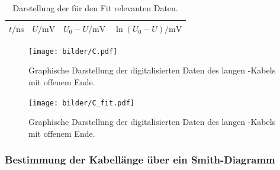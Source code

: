 \begin{table}[htpb]
  \centering
  \begin{tabular}{cccc}
    \midrule
    \midrule
    $t / \si{\nano\second}$ & $U / \si{\milli\volt}$ &
    $U_0 - U / \si{\milli\volt}$ & $\ln(U_0 - U) / \si{\milli\volt}$ \\
    \midrule
    
    \midrule
    \midrule
  \end{tabular}
  \caption{Darstellung der für den Fit relevanten Daten.}
\label{tab:C_fit}
\end{table}

\begin{figure}[htpb]
  \centering
  \texttt{[image: bilder/C.pdf]}
  \caption{Graphische Darstellung der digitalisierten Daten des langen
    \CU-Kabels mit offenem Ende.}
\label{fig:C_roh_Daten}
  \texttt{[image: bilder/C\_fit.pdf]}
  \caption{Graphische Darstellung der digitalisierten Daten des langen
    \CU-Kabels mit offenem Ende.}
\label{fig:C_fit}
\end{figure}


\clearpage
\subsubsection{Bestimmung der Kabellänge über ein Smith-Diagramm}
\label{ssub:bestimmung_der_kabell_nge_ber_ein_smith_diagramm}

